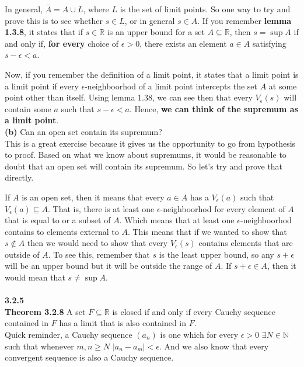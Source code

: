 In general, $\bar{A} = A \cup L$, where $L$ is the set of limit points.
So one way to try and prove this is to see whether $s \in L$, or in general $s \in A$.
If you remember \textbf{lemma 1.3.8},
it states that if $s \in \mathbb{R}$ is an upper bound for a set $A \subseteq \mathbb{R}$,
then $s = \sup A$ if and only if, \textbf{for every} choice of $\epsilon > 0$,
there exists an element $a \in A$ satisfying $s - \epsilon < a$.

Now, if you remember the definition of a limit point, it states that a limit point is a limit point
if every $\epsilon$-neighboorhod of a limit point intercepts the set $A$ at some point other than itself.
Using lemma 1.38, we can see then that every $V_\epsilon (s)$ will contain some $a$ such that $s - \epsilon < a$.
Hence, \textbf{we can think of the supremum as a limit point}.
\\

\textbf{(b)} Can an open set contain its supremum?
\\

This is a great exercise because it gives us the opportunity to go from hypothesis to proof.
Based on what we know about supremums, it would be reasonable to doubt that an open set will contain its supremum.
So let's try and prove that directly.

If $A$ is an open set, then it means that every $a \in A$ has a $V_\epsilon (a)$ such that $V_{\epsilon} (a) \subseteq A$.
That is, there is at least one $\epsilon$-neighboorhod for every element of $A$ that is equal to or a subset of $A$.
Which means that at least one $\epsilon$-neighboorhod contains to elements external to $A$.
This means that if we wanted to show that $s \not\in A$ then we would need to show that every $V_\epsilon (s)$
contains elements that are outside of $A$.
To see this, remember that $s$ is the least upper bound, so any $s+\epsilon$ will be an upper bound but it will be
outside the range of $A$.
If $s+\epsilon \in A$, then it would mean that $s \neq \sup A$.
\\~\\




\textbf{3.2.5}
\\

\textbf{Theorem 3.2.8} A set $F \subseteq \mathbb{R}$ is closed if and only if every
Cauchy sequence contained in $F$ has a limit that is also contained in $F$.
\\

Quick reminder, a Cauchy sequence $(a_n)$ is one which for every $\epsilon >0$
$\exists N\in\mathbb{N}$ such that whenever $m,n \geq N$ $|a_n - a_m| < \epsilon$.
And we also know that every convergent sequence is also a Cauchy sequence.
\\

